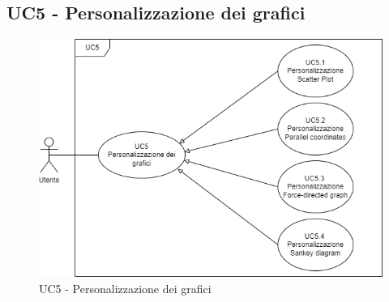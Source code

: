 \subsection{UC5 - Personalizzazione dei grafici}
\begin{figure}[h!]
	\centering
	\includegraphics[scale=0.60]{../../assets/personalizzazioneVisivaGrafici.png}
	\caption{UC5 - Personalizzazione dei grafici}
\end{figure}
